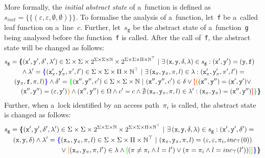 More formally, the \emph{initial abstract state} of a~function is defined as $ s_{init} = \{\{(\varepsilon, \varepsilon, \emptyset, \emptyset)\}\} $. To formalise the analysis of a~function, let~\texttt{f} be a~called leaf function on a~line~$ c $. Further, let~$ s_\mathtt{g} $ be the abstract state of a~function~\texttt{g} being analysed before the function~\texttt{f} is called. After the call of~\texttt{f}, the abstract state will be changed as follows:
$$
\begin{multlined}
    s_\mathtt{g} = \bb{\{}(\mathtt{x}^\prime, \mathtt{y}^\prime, \delta^\prime, \lambda^\prime) \in \Sigma \times \Sigma \times 2^{\Sigma \times \Sigma \times \mathbb{N}} \times 2^{\Sigma \times \Sigma \times \Pi \times \mathbb{N}^\top}\ | \ \exists\,(\mathtt{x}, \mathtt{y}, \delta, \lambda) \in s_\mathtt{g} : (\mathtt{x}^\prime, \mathtt{y}^\prime) = (\mathtt{y}, \mathtt{f}) \\
%
    \wedge \lambda^\prime = \bA{\{}(\mathtt{x}_\pi^\prime, \mathtt{y}_\pi^\prime, \pi^\prime, l^\prime) \in \Sigma \times \Sigma \times \Pi \times \mathbb{N}^\top\  |\ \exists\,(\mathtt{x}_\pi, \mathtt{y}_\pi, \pi, l) \in \lambda : (\mathtt{x}_\pi^\prime, \mathtt{y}_\pi^\prime, \pi^\prime, l^\prime) = \\
%
    (\mathtt{y}_\pi, \mathtt{f}, \pi, l)\bA{\}} \wedge \delta^\prime = \bD{\{}(\mathtt{x}^{\prime\prime}, \mathtt{y}^{\prime\prime}, c^\prime) \in \Sigma \times \Sigma \times \mathbb{N}\ |\ (\mathtt{x}^{\prime\prime}, \mathtt{y}^{\prime\prime}, c^\prime) \in \delta \vee \bC{[}\bB{(}(\mathtt{x}^{\prime\prime}, \mathtt{y}^{\prime\prime}) = (\mathtt{x}^\prime, \mathtt{y}^\prime) \vee \\
%
    (\mathtt{x}^{\prime\prime}, \mathtt{y}^{\prime\prime}) = (\varepsilon, \mathtt{y}^\prime)\bB{)} \wedge (\mathtt{x}^{\prime\prime}, \mathtt{y}^{\prime\prime}) \in \Omega \wedge c^\prime = c \wedge \nexists\,(\mathtt{x}_\pi, \mathtt{y}_\pi, \pi, l) \in \lambda^\prime : (\mathtt{x}_\pi, \mathtt{y}_\pi) = (\mathtt{x}^{\prime\prime}, \mathtt{y}^{\prime\prime})%
%
    \bC{]}\bD{\}}\bb{\}}
\end{multlined}
$$
Further, when a~lock identified by an access path~$ \pi_i $ is called, the abstract state is changed as follows:
$$
\begin{multlined}
    s_\mathtt{g} = \bb{\{}(\mathtt{x}^\prime, \mathtt{y}^\prime, \delta^\prime, \lambda^\prime) \in \Sigma \times \Sigma \times 2^{\Sigma \times \Sigma \times \mathbb{N}} \times 2^{\Sigma \times \Sigma \times \Pi \times \mathbb{N}^\top}\ |\ \exists\,(\mathtt{x}, \mathtt{y}, \delta, \lambda) \in s_\mathtt{g} : (\mathtt{x}^\prime, \mathtt{y}^\prime, \delta^\prime) = \\
%
    (\mathtt{x}, \mathtt{y}, \delta) \wedge \lambda^\prime = \bA{\{}(\mathtt{x}_\pi, \mathtt{y}_\pi, \pi, l) \in \Sigma \times \Sigma \times \Pi \times \mathbb{N}^\top\ |\ (\mathtt{x}_\pi, \mathtt{y}_\pi, \pi, l) = (\varepsilon, \varepsilon, \pi_i, inc_\top(0)) \\
%
    \vee \bB{[}(\mathtt{x}_\pi, \mathtt{y}_\pi, \pi, l^\prime) \in \lambda \wedge \bD{[}(\pi \neq \pi_i \wedge l = l^\prime) \vee (\pi = \pi_i \wedge l = inc_\top(l^\prime))
%
    \bD{]}\bB{]}\bA{\}}\bb{\}}
\end{multlined}
$$
